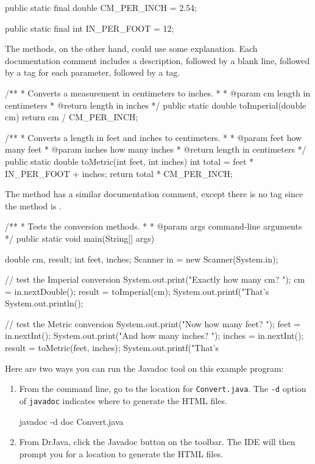 \begin{code}
public static final double CM_PER_INCH = 2.54;

public static final int IN_PER_FOOT = 12;
\end{code}

The methods, on the other hand, could use some explanation.
Each documentation comment includes a description, followed by a blank line, followed by a  tag for each parameter, followed by a  tag.

\begin{code}
/**
 * Converts a measurement in centimeters to inches.
 *
 * @param cm length in centimeters
 * @return length in inches
 */
public static double toImperial(double cm) {
    return cm / CM_PER_INCH;
}

/**
 * Converts a length in feet and inches to centimeters.
 *
 * @param feet how many feet
 * @param inches how many inches
 * @return length in centimeters
 */
public static double toMetric(int feet, int inches) {
    int total = feet * IN_PER_FOOT + inches;
    return total * CM_PER_INCH;
}
\end{code}

The  method has a similar documentation comment, except there is no  tag since the method is .

\begin{code}
/**
 * Tests the conversion methods.
 *
 * @param args command-line arguments
 */
public static void main(String[] args) {
    double cm, result;
    int feet, inches;
    Scanner in = new Scanner(System.in);

    // test the Imperial conversion
    System.out.print("Exactly how many cm? ");
    cm = in.nextDouble();
    result = toImperial(cm);
    System.out.printf("That's %
    System.out.println();

    // test the Metric conversion
    System.out.print("Now how many feet? ");
    feet = in.nextInt();
    System.out.print("And how many inches? ");
    inches = in.nextInt();
    result = toMetric(feet, inches);
    System.out.printf("That's %
}
\end{code}

Here are two ways you can run the Javadoc tool on this example program:

\begin{enumerate}


\item From the command line, go to the location for {\tt Convert.java}.
The {\tt -d} option of {\tt javadoc} indicates where to generate the HTML files.

\begin{stdout}
javadoc -d doc Convert.java
\end{stdout}

\item From DrJava, click the {\sf Javadoc} button on the toolbar.
The IDE will then prompt you for a location to generate the HTML files.
\end{enumerate}

